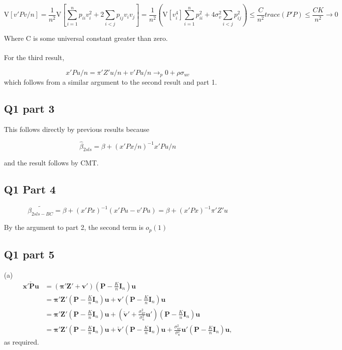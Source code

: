 \documentclass[11pt]{article}
\newcommand{\plim}{\rightarrow_{p}}
\newcommand{\V}{\mathrm{V}}
\begin{document}
$$ \V[v'Pv/n] = \frac{1}{n^2} \V \left[ \sum_{i=1}^{n}p_{ii}v_i^2 + 2\sum_{i<j}^{} p_{ij} v_i v_j  \right] = \frac{1}{n^2} \left( \V[v_i^4] \sum_{i=1}^{n} p_{ii}^2 + 4\sigma_v^2 \sum_{i<j}^{}p^2_{ij} \right) \le \frac{C}{n^2} trace(P'P) \le \frac{CK}{n^2} \rightarrow 0
$$

Where C is some universal constant greater than zero. \\ \\ 

For the third result,

$$ x'Pu/n = \pi'Z'u/n + v'Pu/n \plim 0 + \rho \sigma_{uv}$$
which follows from a similar argument to the second result and part 1. 

\subsection{Q1 part 3 }

This follows directly by previous results because 

$$ \hat{\beta}_{2sls} = \beta + (x'Px/n)^{-1}x'Pu/n$$

and the result follows by CMT. 

\subsection{Q1 Part 4}

$$ \tilde{\beta_{2sls - BC}} = \beta + (x'Px)^{-1}(x'Pu - v'Pu) = \beta + (x'Px)^{-1}\pi'Z'u$$

By the argument to part 2, the second term is $o_p(1)$

\subsection{Q1 part 5}

(a) 
\begin{align*}
\bm{x}'\check{\bm{P}}\bm{u} &=(\bm{\pi}'\bm{Z}'+\bm{v}')(\bm{P} - \frac{K}{n}\bm{I}_n)\bm{u}\\
&=\bm{\pi}'\bm{Z}'(\bm{P} - \frac{K}{n}\bm{I}_n)\bm{u} + \bm{v}'(\bm{P} - \frac{K}{n}\bm{I}_n)\bm{u}\\
&=\bm{\pi}'\bm{Z}'(\bm{P} - \frac{K}{n}\bm{I}_n)\bm{u} + \left(\check{\bm{v}}' + \frac{\sigma^2_{uv}}{\sigma^2_u}\bm{u}'\right)(\bm{P} - \frac{K}{n}\bm{I}_n)\bm{u}\\
&=\bm{\pi}'\bm{Z}'(\bm{P} - \frac{K}{n}\bm{I}_n)\bm{u} + \check{\bm{v}}'(\bm{P} - \frac{K}{n}\bm{I}_n)\bm{u} + \frac{\sigma^2_{uv}}{\sigma^2_u}\bm{u}'(\bm{P} - \frac{K}{n}\bm{I}_n)\bm{u},
\end{align*}
as required.
\end{document}
